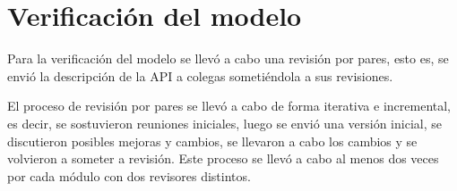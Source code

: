 \section{Verificación del modelo}

Para la verificación del modelo se llevó a cabo una revisión por pares, esto es, se envió la descripción de la API a colegas  sometiéndola a sus revisiones. 

El proceso de revisión por pares se llevó a cabo de forma iterativa e incremental, es decir, se sostuvieron reuniones iniciales, luego se envió una versión inicial, se discutieron posibles mejoras y cambios, se llevaron a cabo los cambios y se volvieron a someter a revisión. Este proceso se llevó a cabo al menos dos veces por cada módulo con dos revisores distintos.
